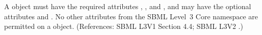 A \Unit object must have the required attributes ,
,  and , and may have the
optional attributes  and .  No other
attributes from the SBML Level~3 Core namespace are permitted on a \Unit
object.  (References: SBML L3V1 Section 4.4; SBML L3V2 .)
